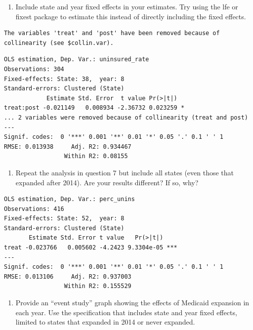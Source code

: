 \documentclass[
  letterpaper,
  DIV=11,
  numbers=noendperiod]{scrartcl}
\providecommand{\tightlist}{%
  \setlength{\itemsep}{0pt}\setlength{\parskip}{0pt}}\usepackage{longtable,booktabs,array}
\begin{document}
\begin{enumerate}
\def\labelenumi{\arabic{enumi}.}
\setcounter{enumi}{6}
\tightlist
\item
  Include state and year fixed effects in your estimates. Try using the
  lfe or fixest package to estimate this instead of directly including
  the fixed effects.
\end{enumerate}

\begin{verbatim}
The variables 'treat' and 'post' have been removed because of collinearity (see $collin.var).
\end{verbatim}

\begin{verbatim}
OLS estimation, Dep. Var.: uninsured_rate
Observations: 304
Fixed-effects: State: 38,  year: 8
Standard-errors: Clustered (State) 
            Estimate Std. Error  t value Pr(>|t|)    
treat:post -0.021149   0.008934 -2.36732 0.023259 *  
... 2 variables were removed because of collinearity (treat and post)
---
Signif. codes:  0 '***' 0.001 '**' 0.01 '*' 0.05 '.' 0.1 ' ' 1
RMSE: 0.013938     Adj. R2: 0.934467
                 Within R2: 0.08155 
\end{verbatim}

\begin{enumerate}
\def\labelenumi{\arabic{enumi}.}
\setcounter{enumi}{7}
\tightlist
\item
  Repeat the analysis in question 7 but include all states (even those
  that expanded after 2014). Are your results different? If so, why?
\end{enumerate}

\begin{verbatim}
OLS estimation, Dep. Var.: perc_unins
Observations: 416
Fixed-effects: State: 52,  year: 8
Standard-errors: Clustered (State) 
       Estimate Std. Error t value   Pr(>|t|)    
treat -0.023766   0.005602 -4.2423 9.3304e-05 ***
---
Signif. codes:  0 '***' 0.001 '**' 0.01 '*' 0.05 '.' 0.1 ' ' 1
RMSE: 0.013106     Adj. R2: 0.937003
                 Within R2: 0.155529
\end{verbatim}

\begin{enumerate}
\def\labelenumi{\arabic{enumi}.}
\setcounter{enumi}{8}
\tightlist
\item
  Provide an ``event study'' graph showing the effects of Medicaid
  expansion in each year. Use the specification that includes state and
  year fixed effects, limited to states that expanded in 2014 or never
  expanded.
\end{enumerate}
\end{document}
